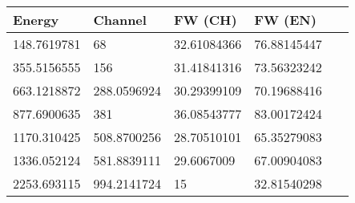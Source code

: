 \begin{table}[H]
    \centering
    \begin{tabular}{|l|l|l|l|l|}
    \hline
        Energy & Channel & FW (CH) & FW (EN) & ~ \\ \hline
        148.7619781 & 68 & 32.61084366 & 76.88145447 & ~ \\ \hline
        355.5156555 & 156 & 31.41841316 & 73.56323242 & ~ \\ \hline
        663.1218872 & 288.0596924 & 30.29399109 & 70.19688416 & ~ \\ \hline
        877.6900635 & 381 & 36.08543777 & 83.00172424 & ~ \\ \hline
        1170.310425 & 508.8700256 & 28.70510101 & 65.35279083 & ~ \\ \hline
        1336.052124 & 581.8839111 & 29.6067009 & 67.00904083 & ~ \\ \hline
        2253.693115 & 994.2141724 & 15 & 32.81540298 & ~ \\ \hline
    \end{tabular}
\end{table}